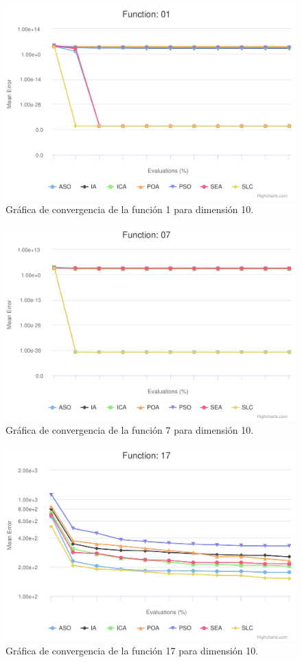 \begin{figure}
	\centering
	\includegraphics[scale=0.6]{imagenes/grafica-convergencia-1.pdf}
	\caption{Gráfica de convergencia de la función 1 para dimensión 10.}
	\label{grafica-convergencia-1}
\end{figure}

\begin{figure}
	\centering
	\includegraphics[scale=0.6]{imagenes/grafica-convergencia-7.pdf}
	\caption{Gráfica de convergencia de la función 7 para dimensión 10.}
	\label{grafica-convergencia-7}
\end{figure}

\begin{figure}
	\centering
	\includegraphics[scale=0.6]{imagenes/grafica-convergencia-17.pdf}
	\caption{Gráfica de convergencia de la función 17 para dimensión 10.}
	\label{grafica-convergencia-17}
\end{figure}